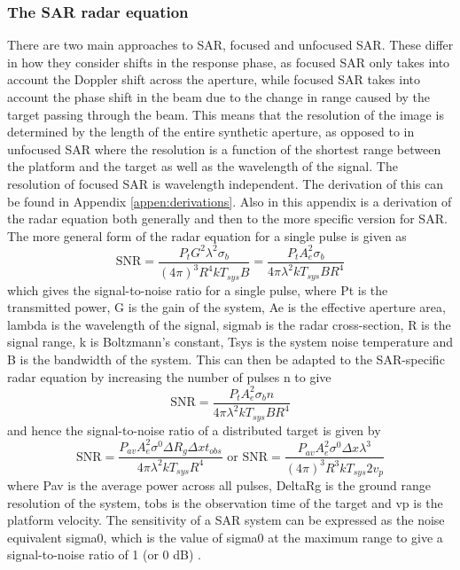 \subsubsection{The SAR radar equation}
There are two main approaches to SAR, focused and unfocused SAR. These differ in how they consider shifts in the response phase, as focused SAR only takes into account the Doppler shift across the aperture, while focused SAR takes into account the phase shift in the beam due to the change in range caused by the target passing through the beam. This means that the resolution of the image is determined by the length of the entire synthetic aperture, as opposed to in unfocused SAR where the resolution is a function of the shortest range between the platform and the target as well as the wavelength of the signal. The resolution of focused SAR is wavelength independent. The derivation of this can be found in Appendix \ref{appen:derivations}. Also in this appendix is a derivation of the radar equation both generally and then to the more specific version for SAR. The more general form of the radar equation for a single pulse is given as \[ \text{SNR} = \frac{P_t G^2 \lambda ^ 2 \sigma _b}{(4\pi)^3R^4kT_{sys} B} = \frac{P_t A_e^2 \sigma_b}{4\pi\lambda^2kT_{sys}BR^4}\] which gives the signal-to-noise ratio for a single pulse, where \gls{Pt} is the transmitted power, \gls{G} is the gain of the system, \gls{Ae} is the effective aperture area, \gls{lambda} is the wavelength of the signal, \gls{sigmab} is the radar cross-section, \gls{R} is the signal range, \gls{k} is Boltzmann's constant, \gls{Tsys} is the system noise temperature and \gls{B} is the bandwidth of the system. This can then be adapted to the SAR-specific radar equation by increasing the number of pulses \gls{n} to give \[\text{SNR} = \frac{P_t A_e^2 \sigma_b n}{4\pi \lambda^2kT_{sys}BR^4}\] and hence the signal-to-noise ratio of a distributed target is given by \[\text{SNR}=\frac{P_{av} A_e^2 \sigma^0\Delta R_g \Delta x t_{obs}}{4\pi\lambda^2kT_{sys}R^4} \text{     or     } \text{SNR} = \frac{P_{av}A_e^2\sigma^0\Delta x\lambda^3}{(4\pi)^3R^3kT_{sys}2v_p} \] where \gls{Pav} is the average power across all pulses, \gls{DeltaRg} is the ground range resolution of the system, \gls{tobs} is the observation time of the target and \gls{vp} is the platform velocity. The sensitivity of a SAR system can be expressed as the noise equivalent \gls{sigma0}, which is the value of \gls{sigma0} at the maximum range to give a signal-to-noise ratio of 1 (or 0 dB) \cite{watsonEE40136RadarSystems2020}.

